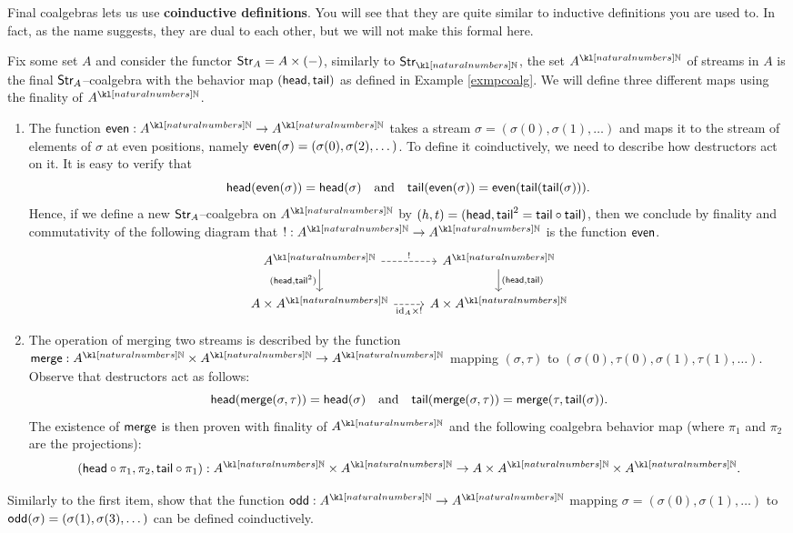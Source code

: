\documentclass[main.tex]{subfiles}
\begin{document}
Final coalgebras lets us use \textbf{coinductive definitions}. You will see that they are quite similar to inductive definitions you are used to. In fact, as the name suggests, they are dual to each other, but we will not make this formal here.
\begin{exmps}
	Fix some set $A$ and consider the functor $\textsf{Str}_A = A \times (-)$, similarly to $\Str_{\N}$, the set $A^{\N}$ of streams in $A$ is the final $\textsf{Str}_A$--coalgebra with the behavior map $(\textsf{head}, \textsf{tail})$ as defined in Example \ref{exmpcoalg}. We will define three different maps using the finality of $A^{\N}$.
	
	\begin{enumerate}
		\item The function $\sfeven: A^{\N}\rightarrow A^{\N}$ takes a stream $\sigma = (\sigma(0), \sigma(1), \dots)$ and maps it to the stream of elements of $\sigma$ at even positions, namely $\textsf{even}(\sigma) = (\sigma(0), \sigma(2), \dots )$. To define it coinductively, we need to describe how destructors act on it. It is easy to verify that 
		\[\textsf{head}(\textsf{even}(\sigma)) = \textsf{head}(\sigma) \quad \text{and} \quad \textsf{tail}(\textsf{even}(\sigma)) = \textsf{even}(\textsf{tail}(\textsf{tail}(\sigma))).\]
        Hence, if we define a new $\textsf{Str}_A$--coalgebra on $A^{\N}$ by $(h,t) = (\textsf{head}, \textsf{tail}^2 = \textsf{tail} \circ \textsf{tail})$, then we conclude by finality and commutativity of the following diagram that $!:A^{\N} \rightarrow A^{\N}$ is the function $\textsf{even}$.
		\begin{equation}\label{diag-evendef}
			\centering
			\begin{tikzcd}
				A^{\N} \arrow[d, "{(\head, \tail^2)}"'] \arrow[r, "!", dashed] & A^{\N} \arrow[d, "{(\head, \tail)}"] \\
				A\times A^{\N} \arrow[r, "\text{id}_A \times !"', dashed]      & A\times A^{\N}                      
			\end{tikzcd}
		\end{equation}
		\item The operation of merging two streams is described by the function $\sfmerge: A^{\N} \times A^{\N} \rightarrow A^{\N}$ mapping $(\sigma, \tau)$ to $(\sigma(0), \tau(0), \sigma(1), \tau(1), \dots)$. Observe that destructors act as follows:
		\[\textsf{head}(\textsf{merge}(\sigma, \tau)) = \textsf{head}(\sigma) \quad \text{and} \quad \textsf{tail}(\textsf{merge}(\sigma,\tau)) = \textsf{merge}(\tau, \textsf{tail}(\sigma)).\]
		The existence of $\textsf{merge}$ is then proven with finality of $A^{\N}$ and the following coalgebra behavior map (where $\pi_1$ and $\pi_2$ are the projections):
		\[(\head\circ \pi_1, \pi_2, \tail \circ \pi_1): A^{\N} \times A^{\N} \rightarrow A \times A^{\N} \times A^{\N}.\]
	\end{enumerate}
\end{exmps}
\begin{exer}[1pts]
    Similarly to the first item, show that the function $\sfodd: A^{\N}\rightarrow A^{\N}$ mapping $\sigma = (\sigma(0), \sigma(1), \dots)$ to $\textsf{odd}(\sigma) = (\sigma(1), \sigma(3), \dots )$ can be defined coinductively.
\end{exer}
\end{document}
